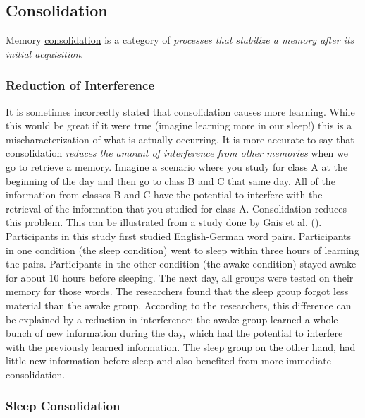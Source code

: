 \documentclass[
]{krantz}
\begin{document}
\subsection*{Consolidation}\label{consolidation}


Memory \hyperref[consolidation]{consolidation} is a category of \emph{processes that stabilize a memory after its initial acquisition}.

\subsubsection*{Reduction of Interference}\label{reduction-of-interference}


It is sometimes incorrectly stated that consolidation causes more learning. While this would be great if it were true (imagine learning more in our sleep!) this is a mischaracterization of what is actually occurring. It is more accurate to say that consolidation \emph{reduces the amount of interference from other memories} when we go to retrieve a memory. Imagine a scenario where you study for class A at the beginning of the day and then go to class B and C that same day. All of the information from classes B and C have the potential to interfere with the retrieval of the information that you studied for class A. Consolidation reduces this problem. This can be illustrated from a study done by Gais et al. (). Participants in this study first studied English-German word pairs. Participants in one condition (the sleep condition) went to sleep within three hours of learning the pairs. Participants in the other condition (the awake condition) stayed awake for about 10 hours before sleeping. The next day, all groups were tested on their memory for those words. The researchers found that the sleep group forgot less material than the awake group. According to the researchers, this difference can be explained by a reduction in interference: the awake group learned a whole bunch of new information during the day, which had the potential to interfere with the previously learned information. The sleep group on the other hand, had little new information before sleep and also benefited from more immediate consolidation.

\subsubsection*{Sleep Consolidation}\label{sleep-consolidation}
\end{document}
